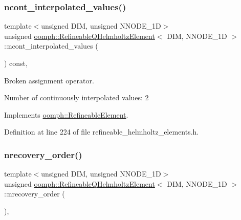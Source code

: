 \subsubsection{\texorpdfstring{ncont\+\_\+interpolated\+\_\+values()}{ncont\_interpolated\_values()}}
{\footnotesize\ttfamily template$<$unsigned D\+IM, unsigned N\+N\+O\+D\+E\+\_\+1D$>$ \\
unsigned \hyperlink{classoomph_1_1RefineableQHelmholtzElement}{oomph\+::\+Refineable\+Q\+Helmholtz\+Element}$<$ D\+IM, N\+N\+O\+D\+E\+\_\+1D $>$\+::ncont\+\_\+interpolated\+\_\+values (\begin{DoxyParamCaption}{ }\end{DoxyParamCaption}) const\hspace{0.3cm}{\ttfamily [inline]}, {\ttfamily [virtual]}}



Broken assignment operator. 

Number of continuously interpolated values\+: 2 

Implements \hyperlink{classoomph_1_1RefineableElement_a53e171a18c9f43f1db90a6876516a073}{oomph\+::\+Refineable\+Element}.



Definition at line 224 of file refineable\+\_\+helmholtz\+\_\+elements.\+h.

\mbox{\label{classoomph_1_1RefineableQHelmholtzElement_ab5156aa04802c1bea18173abbe94cc20}} 
\subsubsection{\texorpdfstring{nrecovery\+\_\+order()}{nrecovery\_order()}}
{\footnotesize\ttfamily template$<$unsigned D\+IM, unsigned N\+N\+O\+D\+E\+\_\+1D$>$ \\
unsigned \hyperlink{classoomph_1_1RefineableQHelmholtzElement}{oomph\+::\+Refineable\+Q\+Helmholtz\+Element}$<$ D\+IM, N\+N\+O\+D\+E\+\_\+1D $>$\+::nrecovery\+\_\+order (\begin{DoxyParamCaption}{ }\end{DoxyParamCaption})\hspace{0.3cm}{\ttfamily [inline]}, {\ttfamily [virtual]}}




